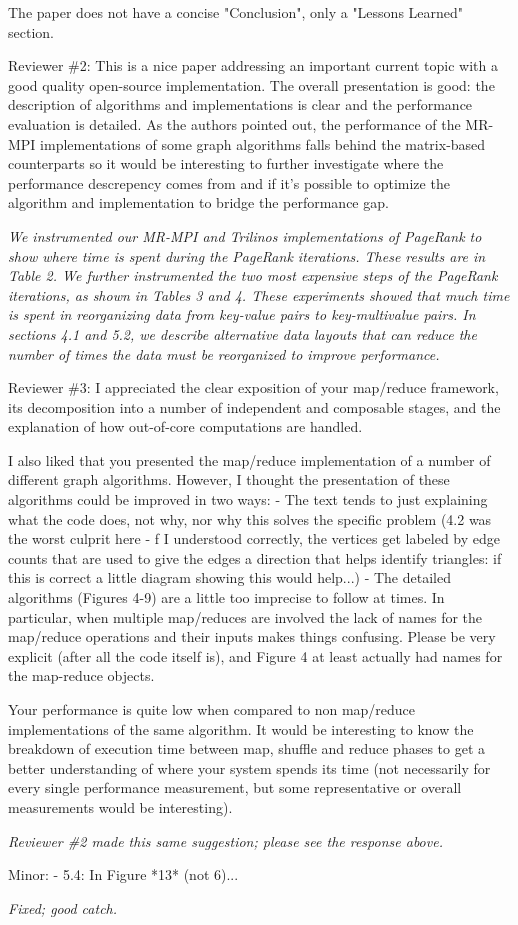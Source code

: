 \documentclass[11pt]{article}
\begin{document}
The paper does not have a concise "Conclusion", only a "Lessons Learned"
section.


\vspace{0.5 in}

Reviewer \#2: This is a nice paper addressing an important current topic
with a good quality open-source implementation.  The overall presentation
is good: the description of algorithms and implementations is clear and the
performance evaluation is detailed. As the authors pointed out, the
performance of the MR-MPI implementations of some graph algorithms falls
behind the matrix-based counterparts so it would be interesting to further
investigate where the performance descrepency comes from and if it's
possible to optimize the algorithm and implementation to bridge the
performance gap.

{\it We instrumented our MR-MPI and Trilinos implementations of PageRank 
to show where time is spent during the PageRank iterations.  These results
are in Table 2.  We further instrumented the two most expensive steps of
the PageRank iterations, as shown in Tables 3 and 4.  These experiments
showed that much time is spent in reorganizing data from key-value pairs
to key-multivalue pairs.  In sections 4.1 and 5.2, we describe alternative
data layouts that can reduce the number of times the data must be 
reorganized to improve performance.}

\vspace{0.5 in}

Reviewer \#3: I appreciated the clear exposition of your map/reduce
framework, its decomposition into a number of independent and composable
stages, and the explanation of how out-of-core computations are handled.

I also liked that you presented the map/reduce implementation of a number
of different graph algorithms. However, I thought the presentation of these
algorithms could be improved in two ways:
- The text tends to just explaining what the code does, not why, nor why
  this solves the specific problem (4.2 was the worst culprit here - f I
understood correctly, the vertices get labeled by edge counts that are used
to give the edges a direction that helps identify triangles: if this is
correct a little diagram showing this would help...)
- The detailed algorithms (Figures 4-9) are a little too imprecise to
  follow at times. In particular, when multiple map/reduces are involved
the lack of names for the map/reduce operations and their inputs makes
things confusing. Please  be very explicit (after all the code itself is),
and Figure 4 at least actually had names for the map-reduce objects.

Your performance is quite low when compared to non map/reduce
implementations of the same algorithm. It would be interesting to know the
breakdown of execution time between map, shuffle and reduce phases to get a
better understanding of where your system spends its time (not necessarily
for every single performance measurement, but some representative or
overall measurements would be interesting).

{\it Reviewer \#2 made this same suggestion; please see the response above.}

Minor:
- 5.4: In Figure *13* (not 6)...

{\it Fixed; good catch.}
\end{document}
